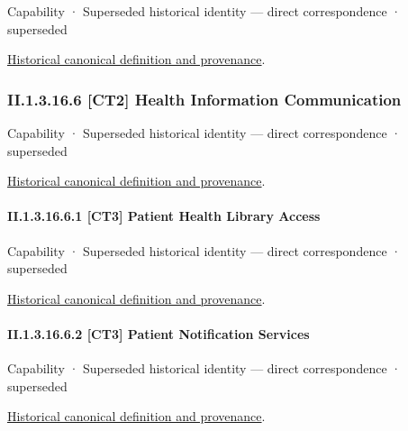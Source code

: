 \label{element:90b838d703dd472b8b6d74961f3a748c}
{\small Capability · Superseded historical identity — direct correspondence · superseded}\par
\href{../../../../continuum/strategy/capability/90b838d703dd472b8b6d74961f3a748c.md}{Historical canonical definition and provenance}.\par
\subsubsection*{II.1.3.16.6 [CT2] Health Information Communication}
\label{navigation:II.1.3.16.6}

\label{element:bcefb378424842fcb6d703208c3f8773}
{\small Capability · Superseded historical identity — direct correspondence · superseded}\par
\href{../../../../continuum/strategy/capability/bcefb378424842fcb6d703208c3f8773.md}{Historical canonical definition and provenance}.\par
\paragraph*{II.1.3.16.6.1 [CT3] Patient Health Library Access}
\label{navigation:II.1.3.16.6.1}

\label{element:b132224cfa6f435f8f2a66a3878d6df6}
{\small Capability · Superseded historical identity — direct correspondence · superseded}\par
\href{../../../../continuum/strategy/capability/b132224cfa6f435f8f2a66a3878d6df6.md}{Historical canonical definition and provenance}.\par
\paragraph*{II.1.3.16.6.2 [CT3] Patient Notification Services}
\label{navigation:II.1.3.16.6.2}

\label{element:35c5be472bf2433fbbde9646d87aefb3}
{\small Capability · Superseded historical identity — direct correspondence · superseded}\par
\href{../../../../continuum/strategy/capability/35c5be472bf2433fbbde9646d87aefb3.md}{Historical canonical definition and provenance}.\par
